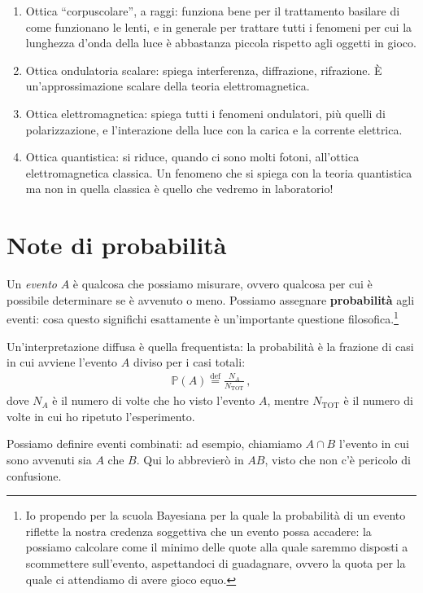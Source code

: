 \documentclass[a4paper,12pt]{article}
\begin{document}
\begin{enumerate}
    \item Ottica ``corpuscolare'', a raggi: funziona bene per il trattamento basilare di come funzionano le lenti, e in generale per trattare tutti i fenomeni per cui la lunghezza d'onda della luce è abbastanza piccola rispetto agli oggetti in gioco. 
    \item Ottica ondulatoria scalare: spiega interferenza, diffrazione, rifrazione. È un'approssimazione scalare della teoria elettromagnetica.
    \item Ottica elettromagnetica: spiega tutti i fenomeni ondulatori, più quelli di polarizzazione, e l'interazione della luce con la carica e la corrente elettrica.
    \item Ottica quantistica: si riduce, quando ci sono molti fotoni, all'ottica elettromagnetica classica. Un fenomeno che si spiega con la teoria quantistica ma non in quella classica è quello che vedremo in laboratorio!
\end{enumerate}

\section{Note di probabilità}

Un \emph{evento} \(A\) è qualcosa che possiamo misurare, ovvero qualcosa per cui è possibile determinare se è avvenuto o meno. 
Possiamo assegnare \textbf{probabilità} agli eventi: cosa questo significhi esattamente è un'importante questione filosofica.\footnote{Io propendo per la scuola Bayesiana per la quale la probabilità di un evento riflette la nostra credenza soggettiva che un evento possa accadere: la possiamo calcolare come il minimo delle quote alla quale saremmo disposti a scommettere sull'evento, aspettandoci di guadagnare, ovvero la quota per la quale ci attendiamo di avere gioco equo.}

Un'interpretazione diffusa è quella frequentista: la probabilità è la frazione di casi in cui avviene l'evento \(A\) diviso per i casi totali: 
%
\begin{align}
    \mathbb{P} (A) \overset{\text{def}}{=} \frac{N_A}{N _{\text{TOT}}}
    \,,
\end{align}
%
dove \(N_A\) è il numero di volte che ho visto l'evento \(A\), mentre \(N _{\text{TOT}}\) è il numero di volte in cui ho ripetuto l'esperimento.

Possiamo definire eventi combinati: ad esempio, chiamiamo \(A\cap B\) l'evento in cui sono avvenuti sia \(A\) che \(B\).
Qui lo abbrevierò in \(AB\), visto che non c'è pericolo di confusione.
\end{document}
